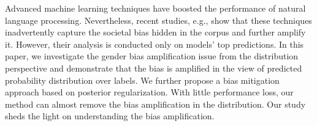 Advanced machine learning techniques have boosted the performance of natural language processing. Nevertheless, recent studies, e.g., \citet{jieyu2017men} show that these techniques inadvertently capture the societal bias hidden in the corpus and further amplify it. However, their analysis is conducted only on models' top predictions. In this paper, we investigate the gender bias amplification issue from the distribution perspective and demonstrate that the bias is amplified in the view of predicted probability distribution over labels. We further propose a bias mitigation approach based on posterior regularization. With little performance loss, our method can almost remove the bias amplification in the distribution. Our study sheds the light on understanding the bias amplification.
